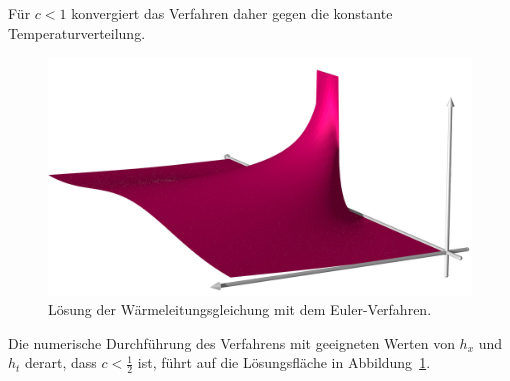 Für $c<1$ konvergiert das Verfahren daher gegen die konstante
Temperaturverteilung.
\begin{figure}
\centering
\includegraphics[width=\hsize]{chapters/70-pde/images/explizit.jpg}
\caption{Lösung der Wärmeleitungsgleichung mit dem Euler-Verfahren.
\label{buch:pde:waerme:figure:euler}}
\end{figure}
Die numerische Durchführung des Verfahrens mit geeigneten Werten von
$h_x$ und $h_t$ derart, dass $c<\frac12$ ist, führt auf die
Lösungsfläche in Abbildung~\ref{buch:pde:waerme:figure:euler}.

